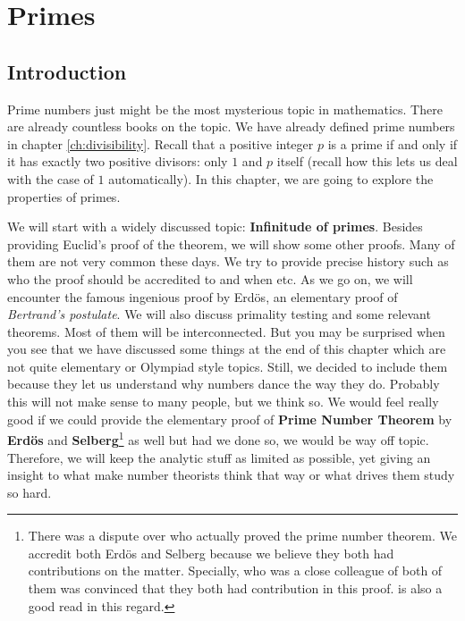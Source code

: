 \documentclass{subfiles}
\begin{document}
\chapter{Primes}\label{ch:primes}

\section{Introduction}
	Prime numbers just might be the most mysterious topic in mathematics. There are already countless books on the topic. We have already defined prime numbers in chapter \eqref{ch:divisibility}. Recall that a positive integer $p$ is a prime if and only if it has exactly two positive divisors: only $1$ and $p$ itself (recall how this lets us deal with the case of $1$ automatically). In this chapter, we are going to explore the properties of primes\watermark.

	We will start with a widely discussed topic: \textbf{Infinitude of primes}. Besides providing Euclid's proof of the theorem, we will show some other proofs. Many of them are not very common these days. We try to provide precise history such as who the proof should be accredited to and when etc. As we go on, we will encounter the famous ingenious proof by Erd\"{o}s, an elementary proof of \textit{Bertrand's postulate}. We will also discuss primality testing and some relevant theorems. Most of them will be interconnected. But you may be surprised when you see that we have discussed some things at the end of this chapter which are not quite elementary or Olympiad style topics. Still, we decided to include them because they let us understand why numbers dance the way they do. Probably this will not make sense to many people, but we think so. We would feel really good if we could provide the elementary proof of \textbf{Prime Number Theorem} by \textbf{Erd\"{o}s} and \textbf{Selberg}\footnote{There was a dispute over who actually proved the prime number theorem. We accredit both Erd\"{o}s and Selberg because we believe they both had contributions on the matter. Specially, \textcite{goldfeld_2004} who was a close colleague of both of them was convinced that they both had contribution in this proof. \textcite{baas_skau_2008} is also a good read in this regard.} as well but had we done so, we would be way off topic. Therefore, we will keep the analytic stuff as limited as possible, yet giving an insight to what make number theorists think that way or what drives them study so hard.
\end{document}
